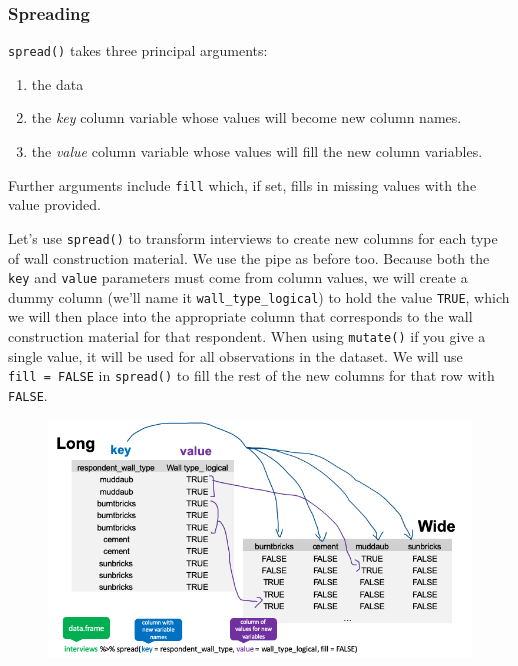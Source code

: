 \documentclass[]{book}
\newenvironment{Shaded}{\begin{snugshade}}{\end{snugshade}}
\newcommand{\KeywordTok}[1]{\textcolor[rgb]{0.13,0.29,0.53}{\textbf{#1}}}
\newcommand{\DataTypeTok}[1]{\textcolor[rgb]{0.13,0.29,0.53}{#1}}
\newcommand{\StringTok}[1]{\textcolor[rgb]{0.31,0.60,0.02}{#1}}
\newcommand{\OtherTok}[1]{\textcolor[rgb]{0.56,0.35,0.01}{#1}}
\newcommand{\OperatorTok}[1]{\textcolor[rgb]{0.81,0.36,0.00}{\textbf{#1}}}
\newcommand{\NormalTok}[1]{#1}
\providecommand{\tightlist}{%
  \setlength{\itemsep}{0pt}\setlength{\parskip}{0pt}}
\begin{document}
\subsubsection{Spreading}\label{spreading}

\texttt{spread()} takes three principal arguments:

\begin{enumerate}
\def\labelenumi{\arabic{enumi}.}
\tightlist
\item
  the data
\item
  the \emph{key} column variable whose values will become new column
  names.
\item
  the \emph{value} column variable whose values will fill the new column
  variables.
\end{enumerate}

Further arguments include \texttt{fill} which, if set, fills in missing
values with the value provided.

Let's use \texttt{spread()} to transform interviews to create new
columns for each type of wall construction material. We use the pipe as
before too. Because both the \texttt{key} and \texttt{value} parameters
must come from column values, we will create a dummy column (we'll name
it \texttt{wall\_type\_logical}) to hold the value \texttt{TRUE}, which
we will then place into the appropriate column that corresponds to the
wall construction material for that respondent. When using
\texttt{mutate()} if you give a single value, it will be used for all
observations in the dataset. We will use \texttt{fill\ =\ FALSE} in
\texttt{spread()} to fill the rest of the new columns for that row with
\texttt{FALSE}.

\begin{Shaded}
\end{Shaded}

\begin{figure}
\centering
\includegraphics{./fig/long_to_wide.png}
\caption{}
\end{figure}
\end{document}
